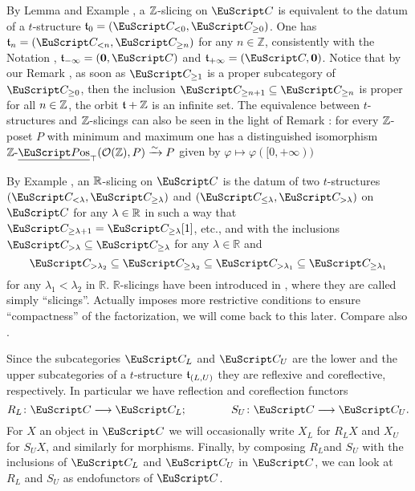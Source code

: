 \begin{example}\label{ex.Z-is-t}
By Lemma  and Example , a $\mathbb{Z} $-slicing on $\C$ is equivalent to the datum of a $t$-structure $\tee_0=(\C_{<0},\C_{\geq 0})$. One has $\tee_n=(\C_{<n},\C_{\geq n})$ for any $n\in \mathbb{Z}$, consistently with the Notation , $\tee_{-\infty}=(\mathbf{0},\C)$ and $\tee_{+\infty}=(\C,\mathbf{0})$. Notice that by our Remark , as soon as $\C_{\ge 1}$ is a proper subcategory of $\C_{\ge 0}$, then the inclusion $\C_{\geq n+1}\subseteq \C_{\geq n}$ is proper for all $n\in\mathbb{Z}$, \ie the orbit $\mathfrak{t} + \mathbb{Z}$ is an infinite set. The equivalence between $t$-structures and $\mathbb{Z}$-slicings can also be seen in the light of Remark : for every $\mathbb{Z}$-poset $P$ with minimum and maximum one has a distinguished isomorphism $\ZPos_{\top}(\mathcal{O}(\Z),P)\xto{\sim}P$ given by $\varphi\mapsto \varphi([0,+\infty))$
\end{example}
\begin{example}\label{what.s.slici}
By Example , an $\mathbb{R}$-slicing on $\C$ is the datum of two $t$-structures $(\C_{<\lambda},\C_{\geq \lambda})$ and  $(\C_{\leq \lambda},\C_{> \lambda})$ on $\C$ for any $\lambda\in \mathbb{R}$ in such a way that $\C_{\geq \lambda+1}=\C_{\geq \lambda}[1]$, etc., and with the inclusions $\C_{>\lambda}\subseteq \C_{\geq\lambda}$ for any $\lambda\in \mathbb{R}$ and 
\[
\C_{>\lambda_2}\subseteq \C_{\geq \lambda_2} \subseteq \C_{>\lambda_1}\subseteq \C_{\geq \lambda_1}
\]
for any $\lambda_1<\lambda_2$ in $\mathbb{R}$. $\mathbb{R}$-slicings have been introduced in \cite{Brid}, where they are called simply ``slicings''. Actually \cite{Brid} imposes more restrictive conditions to ensure ``compactness'' of the factorization, we will come back to this later. Compare also \cite{GKR}.
\end{example}

\begin{remark}
Since the subcategories $\C_L$ and  $\C_U$ are the lower and the upper subcategories of a $t$-structure $\mathfrak{t}_{(L,U)}$ they are reflexive and coreflective, respectively. In particular we have reflection and coreflection functors
\[
R_L\colon \C\to \C_L;\qquad\qquad S_U\colon \C\to \C_U.
\]
For $X$ an object in $\C$ we will occasionally write $X_L$ for $R_LX$ and $X_U$ for $S_UX$, and similarly for morphisms. Finally, by composing $R_L$and $S_U$ with the inclusions of $\C_L$ and $\C_U$ in $\C$, we can look at $R_L$ and $S_U$ as endofunctors of $\C$. 
\end{remark}

